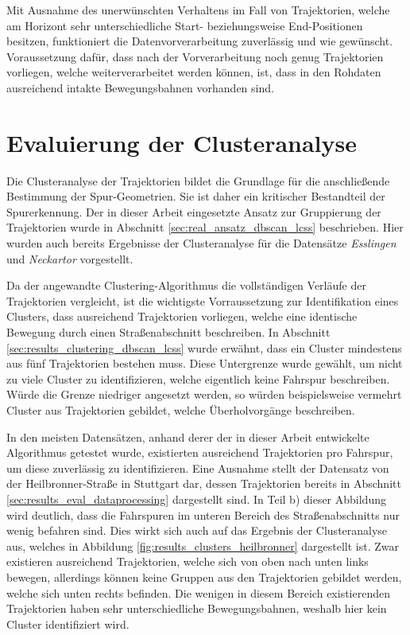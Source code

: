 Mit Ausnahme des unerwünschten Verhaltens im Fall von Trajektorien, welche am Horizont sehr unterschiedliche Start-
beziehungsweise End-Positionen besitzen, funktioniert die Datenvorverarbeitung zuverlässig und wie gewünscht.
Voraussetzung dafür, dass nach der Vorverarbeitung noch genug Trajektorien vorliegen, welche weiterverarbeitet werden können,
ist, dass in den Rohdaten ausreichend intakte Bewegungsbahnen vorhanden sind.

\section{Evaluierung der Clusteranalyse}
\label{sec:results_eval_clustering}

Die Clusteranalyse der Trajektorien bildet die Grundlage für die anschließende Bestimmung der Spur-Geometrien.
Sie ist daher ein kritischer Bestandteil der Spurerkennung. Der in dieser Arbeit eingesetzte Ansatz zur
Gruppierung der Trajektorien wurde in Abschnitt \ref{sec:real_ansatz_dbscan_lcss} beschrieben.
Hier wurden auch bereits Ergebnisse der Clusteranalyse für die Datensätze \textit{Esslingen} und
\textit{Neckartor} vorgestellt.

Da der angewandte Clustering-Algorithmus die vollständigen Verläufe der
Trajektorien vergleicht, ist die wichtigste Vorraussetzung zur Identifikation eines Clusters, dass ausreichend
Trajektorien vorliegen, welche eine identische Bewegung durch einen Straßenabschnitt beschreiben.
In Abschnitt \ref{sec:results_clustering_dbscan_lcss} wurde erwähnt, dass ein Cluster mindestens aus
fünf Trajektorien bestehen muss. Diese Untergrenze wurde gewählt, um nicht zu viele Cluster zu identifizieren, welche
eigentlich keine Fahrspur beschreiben. Würde die Grenze niedriger angesetzt werden, so würden beispielsweise
vermehrt Cluster aus Trajektorien gebildet, welche Überholvorgänge beschreiben.

In den meisten Datensätzen, anhand derer der in dieser Arbeit entwickelte Algorithmus getestet wurde,
existierten ausreichend Trajektorien pro Fahrspur, um diese zuverlässig zu identifizieren. Eine Ausnahme
stellt der Datensatz von der Heilbronner-Straße in Stuttgart dar, dessen Trajektorien bereits
in Abschnitt \ref{sec:results_eval_dataprocessing} dargestellt sind. In Teil b) dieser Abbildung
wird deutlich, dass die Fahrspuren im unteren Bereich des Straßenabschnitts nur wenig befahren sind.
Dies wirkt sich auch auf das Ergebnis der Clusteranalyse aus, welches in Abbildung \ref{fig:results_clusters_heilbronner} dargestellt ist.
Zwar existieren ausreichend Trajektorien, welche sich von oben nach unten links bewegen, allerdings können
keine Gruppen aus den Trajektorien gebildet werden, welche sich unten rechts befinden.
Die wenigen in diesem Bereich existierenden Trajektorien haben sehr unterschiedliche Bewegungsbahnen,
weshalb hier kein Cluster identifiziert wird.

